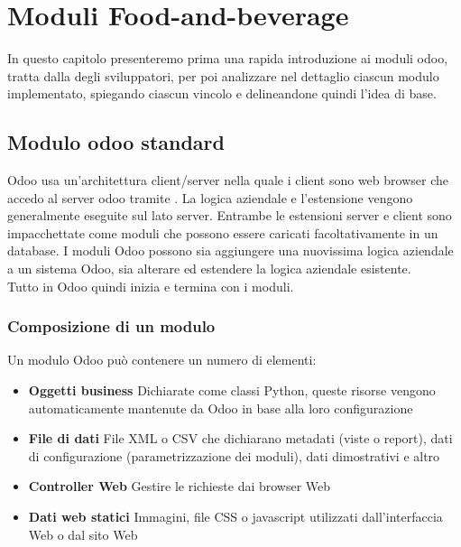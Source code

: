 
\hypertarget{(chap:capitolo4)}{}
\chapter{Moduli Food-and-beverage}
In questo capitolo presenteremo prima una rapida introduzione ai moduli odoo, tratta dalla
 degli sviluppatori, per poi analizzare nel dettaglio ciascun modulo implementato, spiegando ciascun vincolo e delineandone quindi l'idea di base.
\section{Modulo odoo standard}
Odoo usa un'architettura client/server nella quale i client sono web browser che accedo al server odoo tramite .
La logica aziendale e l'estensione vengono generalmente eseguite sul lato server.
Entrambe le estensioni server e client sono impacchettate come moduli che possono essere caricati facoltativamente in un database. I moduli Odoo possono sia aggiungere una nuovissima logica aziendale a un sistema Odoo, sia alterare ed estendere la logica aziendale esistente.\\
Tutto in Odoo quindi inizia e termina con i moduli.


\subsection{Composizione di un modulo}
Un modulo Odoo può contenere un numero di elementi:
\newpage
\begin{itemize}
	\item \textbf{Oggetti business} Dichiarate come classi Python, queste risorse vengono automaticamente mantenute da Odoo in base alla loro configurazione
	\item \textbf{File di dati} File XML o CSV che dichiarano metadati (viste o report), dati di configurazione (parametrizzazione dei moduli), dati dimostrativi e altro
	\item \textbf{Controller Web} Gestire le richieste dai browser Web
	\item \textbf{Dati web statici} Immagini, file CSS o javascript utilizzati dall'interfaccia Web o dal sito Web
\end{itemize}

